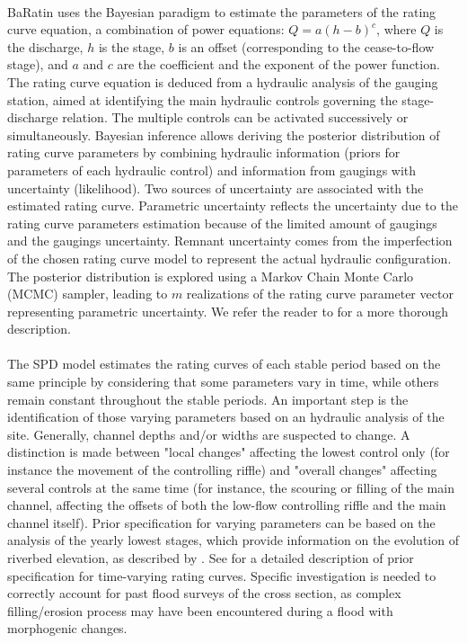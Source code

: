 \documentclass[11pt]{article}
\begin{document}
    \paragraph{} BaRatin uses the Bayesian paradigm to estimate the parameters of the rating curve equation, a combination of power equations: $Q = a(h-b)^c$, where $Q$ is the discharge, $h$ is the stage, $b$ is an offset (corresponding to the cease-to-flow stage), and $a$ and $c$ are the coefficient and the exponent of the power function. The rating curve equation is deduced from a hydraulic analysis of the gauging station, aimed at identifying the main hydraulic controls governing the stage-discharge relation. The multiple controls can be activated successively or simultaneously. Bayesian inference allows deriving the posterior distribution of rating curve parameters by combining hydraulic information (priors for parameters of each hydraulic control) and information from gaugings with uncertainty (likelihood). Two sources of uncertainty are associated with the estimated rating curve. Parametric uncertainty reflects the uncertainty due to the rating curve parameters estimation because of the limited amount of gaugings and the gaugings uncertainty. Remnant uncertainty comes from the imperfection of the chosen rating curve model to represent the actual hydraulic configuration. The posterior distribution is explored using a Markov Chain Monte Carlo (MCMC) sampler, leading to $m$ realizations of the rating curve parameter vector representing parametric uncertainty. We refer the reader to \citet{le_coz_combining_2014} for a more thorough description.

    \paragraph{}
    The SPD model estimates the rating curves of each stable period based on the same principle by considering that some parameters vary in time, while others remain constant throughout the stable periods. An important step is the identification of those varying parameters based on an hydraulic analysis of the site. Generally, channel depths and/or widths are suspected to change. A distinction is made between "local changes" affecting the lowest control only (for instance the movement of the controlling riffle) and "overall changes" affecting several controls at the same time (for instance, the scouring or filling of the main channel, affecting the offsets of both the low-flow controlling riffle and the main channel itself). Prior specification for varying parameters can be based on the analysis of the yearly lowest stages, which provide information on the evolution of riverbed elevation, as described by \citet{lapuszek_methods_2015}. See \citet{mansanarez_shift_2019} for a detailed description of prior specification for time-varying rating curves. Specific investigation is needed to correctly account for past flood surveys of the cross section, as complex filling/erosion process may have been encountered during a flood with morphogenic changes.
    
\end{document}
